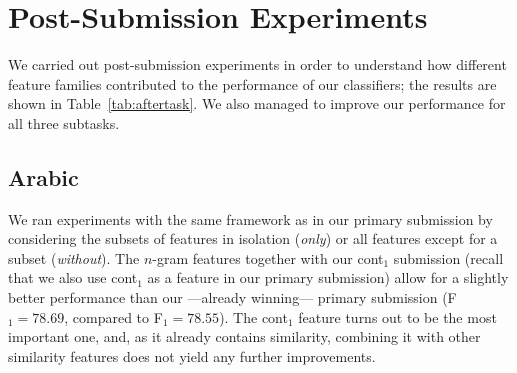 \section{Post-Submission Experiments}
\label{sec:discussion}

We carried out post-submission experiments in order to understand how 
different feature families contributed to the performance of our classifiers;
the results are shown in Table~\ref{tab:aftertask}.
We also managed to improve our performance for all three subtasks.


\subsection{Arabic} \label{sec:discussionArabic}

We ran experiments with the same framework as in our primary submission by 
considering the subsets of features in isolation (\textit{only}) or all features 
except for a subset (\textit{without}). The $n$-gram features together with 
our cont$_1$ submission (recall that we also use cont$_1$ as a feature in our
primary submission) allow for a slightly better performance than our 
---already winning--- primary submission (F$_1=78.69$, compared to 
F$_1=78.55$). The cont$_1$ feature turns out to be the most important one,
and, as it already contains similarity, combining it with other similarity features
does not yield any further improvements.

